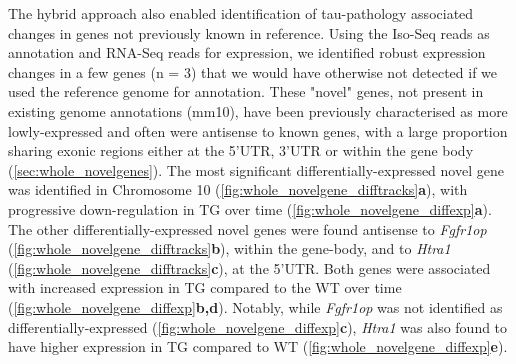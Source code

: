 The hybrid approach also enabled identification of tau-pathology associated changes in genes not previously known in reference. Using the Iso-Seq reads as annotation and RNA-Seq reads for expression, we identified robust expression changes in a few genes (n = 3) that we would have otherwise not detected if we used the reference genome for annotation. These "novel" genes, not present in existing genome annotations (mm10), have been previously characterised as more lowly-expressed and often were antisense to known genes, with a large proportion sharing exonic regions either at the 5'UTR, 3'UTR or within the gene body (\cref{sec:whole_novelgenes}). The most significant differentially-expressed novel gene was identified in Chromosome 10 (\cref{fig:whole_novelgene_difftracks}\textbf{a}), with progressive down-regulation in TG over time (\cref{fig:whole_novelgene_diffexp}\textbf{a}). The other differentially-expressed novel genes were found antisense to \textit{Fgfr1op} (\cref{fig:whole_novelgene_difftracks}\textbf{b}), within the gene-body, and to \textit{Htra1}  (\cref{fig:whole_novelgene_difftracks}\textbf{c}), at the 5'UTR. Both genes were associated with increased expression in TG compared to the WT over time (\cref{fig:whole_novelgene_diffexp}\textbf{b,d}). Notably, while \textit{Fgfr1op} was not identified as differentially-expressed (\cref{fig:whole_novelgene_diffexp}\textbf{c}), \textit{Htra1} was also found to have higher expression in TG compared to WT (\cref{fig:whole_novelgene_diffexp}\textbf{e}).     

